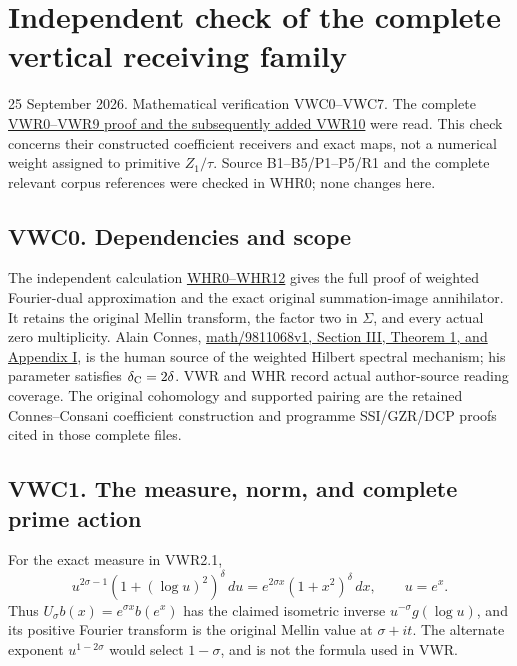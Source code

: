 \section{Independent check of the complete vertical receiving
family}\label{independent-check-of-the-complete-vertical-receiving-family}

25 September 2026. Mathematical verification VWC0--VWC7. The complete
\href{https://github.com/KokunoYumeto/zeta-function-research-reader/blob/main/workbenches/splitzero-tandem/continuations/20260925-full-source-tensor-and-original-divisor/counterfactual/FULL_VERTICAL_WEIGHT_RETURN.md}{VWR0--VWR9
proof and the subsequently added VWR10} were read. This check concerns
their constructed coefficient receivers and exact maps, not a numerical
weight assigned to primitive \(Z_1/\tau\). Source B1--B5/P1--P5/R1 and
the complete relevant corpus references were checked in WHR0; none
changes here.

\subsection{VWC0. Dependencies and
scope}\label{vwc0.-dependencies-and-scope}

The independent calculation
\href{https://github.com/KokunoYumeto/zeta-function-research-reader/blob/main/workbenches/splitzero-tandem/continuations/20260925-full-source-tensor-and-original-divisor/counterfactual/WEIGHTED_HILBERT_RETURN_AND_EXACT_KERNEL.md}{WHR0--WHR12}
gives the full proof of weighted Fourier-dual approximation and the
exact original summation-image annihilator. It retains the original
Mellin transform, the factor two in \(\Sigma\), and every actual zero
multiplicity. Alain Connes,
\href{https://arxiv.org/abs/math/9811068v1}{math/9811068v1, Section III,
Theorem 1, and Appendix I}, is the human source of the weighted Hilbert
spectral mechanism; his parameter satisfies \(\delta_{\rm C}=2\delta\).
VWR and WHR record actual author-source reading coverage. The original
cohomology and supported pairing are the retained Connes--Consani
coefficient construction and programme SSI/GZR/DCP proofs cited in those
complete files.

\subsection{VWC1. The measure, norm, and complete prime
action}\label{vwc1.-the-measure-norm-and-complete-prime-action}

For the exact measure in VWR2.1, \[
u^{2\sigma-1}(1+(\log u)^2)^\delta\,du
=e^{2\sigma x}(1+x^2)^\delta\,dx,\qquad u=e^x.
\] Thus \(U_\sigma b(x)=e^{\sigma x}b(e^x)\) has the claimed isometric
inverse \(u^{-\sigma}g(\log u)\), and its positive Fourier transform is
the original Mellin value at \(\sigma+it\). The alternate exponent
\(u^{1-2\sigma}\) would select \(1-\sigma\), and is not the formula used
in VWR.

